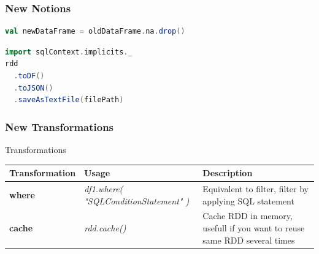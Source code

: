 \documentclass[slidetop,9pt,utf8]{beamer}
\begin{document}
\begin{frame}[fragile]
  \frametitle{New Notions}

  \begin{lstlisting}[label=DropNullValue, caption=Drop rows containing null values, language=scala, style=code]
val newDataFrame = oldDataFrame.na.drop()
  \end{lstlisting}

  \begin{lstlisting}[label=SaveJsonFile, caption=Save RDD to JSON File, language=scala, style=code]
import sqlContext.implicits._
rdd
  .toDF()
  .toJSON()
  .saveAsTextFile(filePath)
  \end{lstlisting}

\end{frame}

\begin{frame}

  \frametitle{New Transformations}

  \begin{block}{Transformations}
    \begin{center}
      \begin{tabular}{|m{2.1cm}|m{3.5cm}|m{5cm}|}
        \hline 
        \rowcolor{gray} \textbf{Transformation} & \textbf{Usage} & \textbf{Description} \\ \hline
        \textbf{where} & \textit{df1.where( \newline  "SQLConditionStatement" \newline )} & Equivalent to filter, filter by applying SQL statement \\ \hline
        \textbf{cache} & \textit{rdd.cache()} & Cache RDD in memory, usefull if you want to reuse same RDD several times \\ \hline
      \end{tabular}
    \end{center}
  \end{block}

\end{frame}
\end{document}
